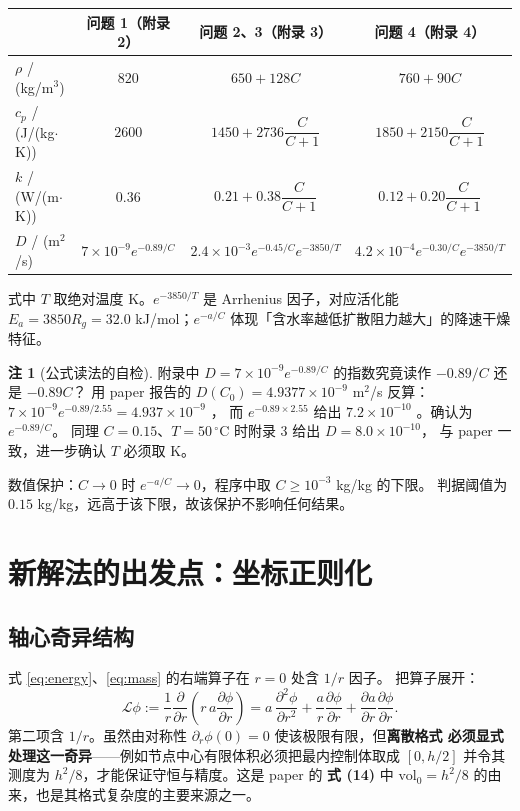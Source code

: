 \documentclass[11pt,a4paper]{article}
\theoremstyle{definition}
\newtheorem{remark}{注}
\begin{document}
\begin{center}
\small
\begin{tabular}{@{}lccc@{}}
\toprule
 & 问题 1（附录 2） & 问题 2、3（附录 3） & 问题 4（附录 4） \\
\midrule
$\rho$ / (kg/m$^3$) & $820$ & $650+128C$ & $760+90C$ \\
$c_p$ / (J/(kg$\cdot$K)) & $2600$ & $1450+2736\dfrac{C}{C+1}$ & $1850+2150\dfrac{C}{C+1}$ \\
$k$ / (W/(m$\cdot$K)) & $0.36$ & $0.21+0.38\dfrac{C}{C+1}$ & $0.12+0.20\dfrac{C}{C+1}$ \\
$D$ / (m$^2$/s) & $7\times10^{-9}e^{-0.89/C}$ &
$2.4\times10^{-3}e^{-0.45/C}e^{-3850/T}$ &
$4.2\times10^{-4}e^{-0.30/C}e^{-3850/T}$ \\
\bottomrule
\end{tabular}
\end{center}
式中 $T$ 取绝对温度 K。$e^{-3850/T}$ 是 Arrhenius 因子，对应活化能
$E_a=3850R_g=32.0$ kJ/mol；$e^{-a/C}$ 体现「含水率越低扩散阻力越大」的降速干燥特征。

\begin{remark}[公式读法的自检]
附录中 $D=7\times10^{-9}e^{-0.89/C}$ 的指数究竟读作 $-0.89/C$ 还是 $-0.89C$？
用 paper 报告的 $D(C_0)=4.9377\times10^{-9}$ m$^2$/s 反算：
$7\times10^{-9}e^{-0.89/2.55}=4.937\times10^{-9}$ \checkmark，
而 $e^{-0.89\times2.55}$ 给出 $7.2\times10^{-10}$ 。确认为 $e^{-0.89/C}$。
同理 $C=0.15$、$T=50\,^\circ$C 时附录 3 给出 $D=8.0\times10^{-10}$，
与 paper 一致，进一步确认 $T$ 必须取 K。
\end{remark}

数值保护：$C\to0$ 时 $e^{-a/C}\to0$，程序中取 $C\ge10^{-3}$ kg/kg 的下限。
判据阈值为 $0.15$ kg/kg，远高于该下限，故该保护不影响任何结果。

\section{新解法的出发点：坐标正则化}

\subsection{轴心奇异结构}

式 \eqref{eq:energy}、\eqref{eq:mass} 的右端算子在 $r=0$ 处含 $1/r$ 因子。
把算子展开：
\[
\mathcal{L}\phi:=\frac{1}{r}\frac{\partial}{\partial r}\!\left(r\,a\frac{\partial \phi}{\partial r}\right)
=a\,\frac{\partial^2\phi}{\partial r^2}+\frac{a}{r}\frac{\partial \phi}{\partial r}
+\frac{\partial a}{\partial r}\frac{\partial \phi}{\partial r}.
\]
第二项含 $1/r$。虽然由对称性 $\partial_r\phi(0)=0$ 使该极限有限，但\textbf{离散格式
必须显式处理这一奇异}——例如节点中心有限体积必须把最内控制体取成
$[0,h/2]$ 并令其测度为 $h^2/8$，才能保证守恒与精度。这是 paper 的
\textbf{式 (14)} 中 $\mathrm{vol}_0=h^2/8$ 的由来，也是其格式复杂度的主要来源之一。
\end{document}
